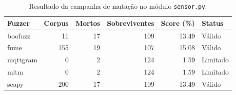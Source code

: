 \begin{table}[htbp]
\centering
\caption{Resultado da campanha de mutação no módulo \texttt{sensor.py}.}
\label{tab:resultados_sensor}
\begin{tabular}{lrrrrl}
\hline
\textbf{Fuzzer} & \textbf{Corpus} & \textbf{Mortos} & \textbf{Sobreviventes} & \textbf{Score (\%)} & \textbf{Status} \\
\hline
boofuzz & 11 & 17 & 109 & 13.49 & Válido \\
fume & 155 & 19 & 107 & 15.08 & Válido \\
mqttgram & 0 & 2 & 124 & 1.59 & Limitado \\
mitm & 0 & 2 & 124 & 1.59 & Limitado \\
scapy & 200 & 17 & 109 & 13.49 & Válido \\
\hline
\end{tabular}
\end{table}
